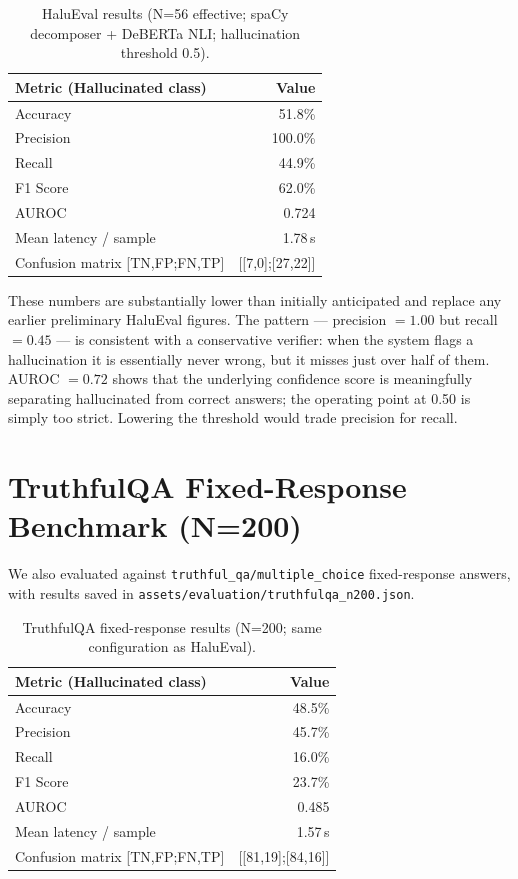 \documentclass[12pt, a4paper, oneside]{report}
\begin{document}
\begin{table}[H]
\centering
\caption{HaluEval results (N=56 effective; spaCy decomposer + DeBERTa NLI; hallucination threshold 0.5).}
\label{tab:halueval}
\begin{tabular}{l r}
\toprule
\textbf{Metric (Hallucinated class)} & \textbf{Value} \\
\midrule
Accuracy & 51.8\% \\
Precision & 100.0\% \\
Recall & 44.9\% \\
F1 Score & 62.0\% \\
AUROC & 0.724 \\
Mean latency / sample & 1.78\,s \\
Confusion matrix [TN,FP;FN,TP] & [[7,0];[27,22]] \\
\bottomrule
\end{tabular}
\end{table}

These numbers are substantially lower than initially anticipated and replace any earlier preliminary HaluEval figures. The pattern --- precision $= 1.00$ but recall $= 0.45$ --- is consistent with a conservative verifier: when the system flags a hallucination it is essentially never wrong, but it misses just over half of them. AUROC $= 0.72$ shows that the underlying confidence score is meaningfully separating hallucinated from correct answers; the operating point at 0.50 is simply too strict. Lowering the threshold would trade precision for recall.

\section{TruthfulQA Fixed-Response Benchmark (N=200)}

We also evaluated against \texttt{truthful\_qa/multiple\_choice} fixed-response answers, with results saved in \texttt{assets/evaluation/truthfulqa\_n200.json}.

\begin{table}[H]
\centering
\caption{TruthfulQA fixed-response results (N=200; same configuration as HaluEval).}
\label{tab:truthfulqa}
\begin{tabular}{l r}
\toprule
\textbf{Metric (Hallucinated class)} & \textbf{Value} \\
\midrule
Accuracy & 48.5\% \\
Precision & 45.7\% \\
Recall & 16.0\% \\
F1 Score & 23.7\% \\
AUROC & 0.485 \\
Mean latency / sample & 1.57\,s \\
Confusion matrix [TN,FP;FN,TP] & [[81,19];[84,16]] \\
\bottomrule
\end{tabular}
\end{table}
\end{document}
